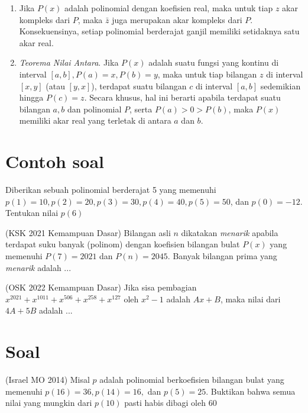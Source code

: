 \documentclass[11pt]{scrartcl}
\begin{document}
\begin{enumerate}
    \item Jika $P(x)$ adalah polinomial dengan koefisien real, maka untuk tiap $z$ akar kompleks dari $P$, maka $\bar{z}$ juga merupakan akar kompleks dari $P$. Konsekuensinya, setiap polinomial berderajat ganjil memiliki setidaknya satu akar real.
    \item \textit{Teorema Nilai Antara}. Jika $P(x)$ adalah suatu fungsi yang kontinu di interval $[a,b], P(a) = x, P(b) = y$, maka untuk tiap bilangan $z$ di interval $[x,y]$ (atau $[y,x]$), terdapat suatu bilangan $c$ di interval $[a,b]$ sedemikian hingga $P(c) = z$. Secara khusus, hal ini berarti apabila terdapat suatu bilangan $a,b$ dan polinomial $P$, serta $P(a)>0>P(b)$, maka $P(x)$ memiliki akar real yang terletak di antara $a$ dan $b$.
\end{enumerate}

\section{Contoh soal}
\begin{example}
    Diberikan sebuah polinomial berderajat 5 yang memenuhi $p(1) = 10, p(2) = 20, p(3) = 30, p(4) = 40, p(5) = 50$, dan $p(0) = -12$. Tentukan nilai $p(6)$
\end{example}

\begin{example}
    (KSK 2021 Kemampuan Dasar) Bilangan asli $n$ dikatakan \textit{menarik} apabila terdapat suku banyak (polinom) dengan koefisien bilangan bulat $P(x)$ yang memenuhi $P(7) = 2021$ dan $P(n) = 2045$. Banyak bilangan prima yang \textit{menarik} adalah ...
\end{example}

\begin{example}
    (OSK 2022 Kemampuan Dasar) Jika sisa pembagian $x^{2021} + x^{1011} + x^{506} + x^{258} + x^{127}$ oleh $x^2 - 1$ adalah $Ax + B$, maka nilai dari $4A + 5B$ adalah ...
\end{example}

\section{Soal}
\begin{problem}
    (Israel MO 2014) Misal $p$ adalah polinomial berkoefisien bilangan bulat yang memenuhi $p(16) = 36, p(14) = 16,$ dan $p(5) = 25$. Buktikan bahwa semua nilai yang mungkin dari $p(10)$ pasti habis dibagi oleh $60$
\end{problem}
\end{document}
